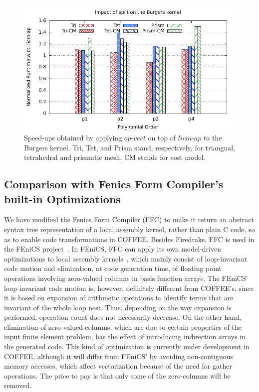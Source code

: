 \documentclass[conference]{IEEEtran}
\begin{document}
\begin{figure}[h]
\includegraphics[scale=0.7]{Pictures/burgers-normalized-split.pdf}
\caption{Speed-ups obtained by applying $op$-$vect$ on top of $licm$-$ap$ to the Burgers kernel. Tri, Tet, and Prism stand, respectively, for triangual, tetrahedral and prismatic mesh. CM stands for cost model.}
\label{fig:split-burgers-speedup}
\end{figure}


\subsection{Comparison with Fenics Form Compiler's built-in Optimizations}
We have modified the Fenics Form Compiler (FFC) to make it return an abstract syntax tree representation of a local assembly kernel, rather than plain C code, so as to enable code transformations in COFFEE. Besides Firedrake, FFC is used in the FEniCS project~\cite{Fenics}. In FEniCS, FFC can apply its own model-driven optimizations to local assembly kernels~\cite{quadrature1}, which mainly consist of loop-invariant code motion and elimination, at code generation time, of floating point operations involving zero-valued columns in basis function arrays. The FEniCS' loop-invariant code motion is, however, definitely different from COFFEE's, since it is based on expansion of arithmetic operations to identify terms that are invariant of the whole loop nest. Thus, depending on the way expansion is performed, operation count does not necessarily decrease. On the other hand, elimination of zero-valued columns, which are due to certain properties of the input finite element problem, has the effect of introducing indirection arrays in the generated code. This kind of optimization is currently under development in COFFEE, although it will differ from FEniCS' by avoiding non-contiguous memory accesses, which affect vectorization because of the need for gather operations. The price to pay is that only some of the zero-columns will be removed.
\end{document}
